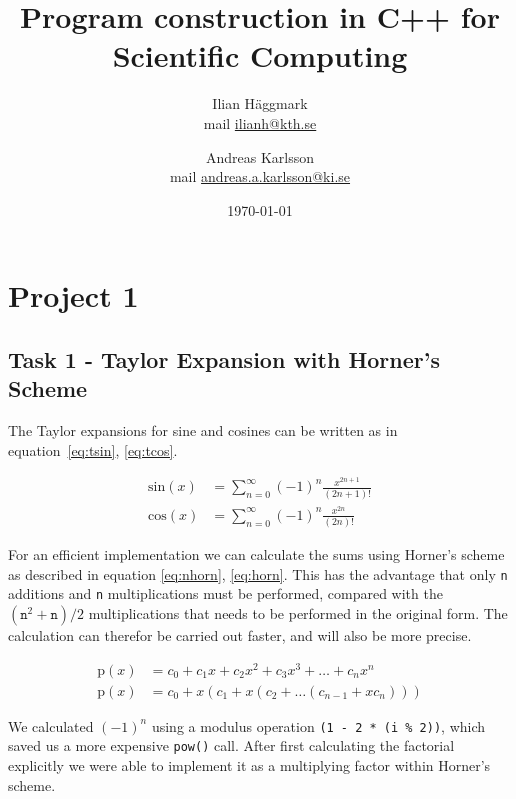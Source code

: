 \documentclass[paper=a4, fontsize=11pt]{article} %
\title{Program construction in C++ for Scientific Computing}
\author{Ilian H{\"a}ggmark \\ mail \href{mailto:ilianh@kth.se}{ilianh@kth.se}
  \and Andreas Karlsson \\ mail \href{mailto:andreas.a.karlsson@ki.se}{andreas.a.karlsson@ki.se} }
\date{\normalsize\today} %
\begin{document}
\maketitle %

\section{Project 1}
\subsection{Task 1 - Taylor Expansion with Horner's Scheme}

The Taylor expansions for sine and cosines can be written as in
equation~\ref{eq:tsin}, \ref{eq:tcos}.

\begin{align}
  \text{sin}(x) &= \sum\limits_{n=0}^\infty{(-1)^{n}\frac{x^{2n+1}}{(2n+1)!}} \label{eq:tsin}\\
  \text{cos}(x) &= \sum\limits_{n=0}^\infty{(-1)^{n}\frac{x^{2n}}{(2n)!}} \label{eq:tcos}
\end{align}

\noindent
For an efficient implementation we can calculate the sums using
Horner's scheme as described in equation \ref{eq:nhorn},
\ref{eq:horn}. This has the advantage that only \texttt{n} additions
and \texttt{n} multiplications must be performed, compared with the
$(\mathtt{n}^{2} + \mathtt{n}) / 2$ multiplications that needs to be performed in the
original form. The calculation can therefor be carried out faster, and
will also be more precise.

\begin{align}
  \text{p}(x) &= c_{0} + c_{1}x + c_{2}x^{2} + c_{3}x^{3} +\dots+c_{n}x^{n} \label{eq:nhorn}\\
  \text{p}(x) &= c_{0} + x(c_{1} + x(c_{2} + \dots (c_{n-1} + xc_{n}))) \label{eq:horn}
\end{align}

\noindent
We calculated $(-1)^n$ using a modulus operation
\lstinline$(1 - 2 * (i % 2))$, which saved us a more expensive
\lstinline$pow()$ call. After first calculating the factorial
explicitly we were able to implement it as a multiplying factor within
Horner's scheme.
\end{document}
